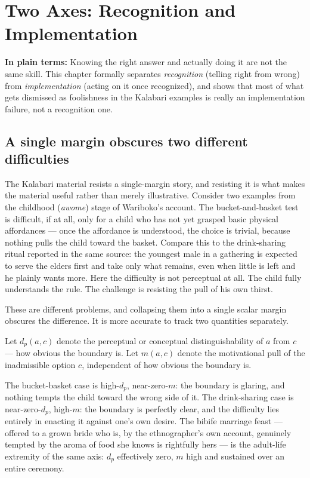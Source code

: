\chapter{Two Axes: Recognition and Implementation}
\label{ch:two-axes}

\begin{plainlanguage}
\textbf{In plain terms:} Knowing the right answer and actually doing it are not the same skill. This chapter formally separates \emph{recognition} (telling right from wrong) from \emph{implementation} (acting on it once recognized), and shows that most of what gets dismissed as foolishness in the Kalabari examples is really an implementation failure, not a recognition one.
\end{plainlanguage}

\section{A single margin obscures two different difficulties}

The Kalabari material resists a single-margin story, and resisting it is what makes the material useful rather than merely illustrative. Consider two examples from the childhood (\emph{awome}) stage of Wariboko's account. The bucket-and-basket test is difficult, if at all, only for a child who has not yet grasped basic physical affordances --- once the affordance is understood, the choice is trivial, because nothing pulls the child toward the basket. Compare this to the drink-sharing ritual reported in the same source: the youngest male in a gathering is expected to serve the elders first and take only what remains, even when little is left and he plainly wants more. Here the difficulty is not perceptual at all. The child fully understands the rule. The challenge is resisting the pull of his own thirst.

These are different problems, and collapsing them into a single scalar margin obscures the difference. It is more accurate to track two quantities separately.

\begin{definition}
Let $d_p(a,c)$ denote the perceptual or conceptual distinguishability of $a$ from $c$ --- how obvious the boundary is. Let $m(a,c)$ denote the motivational pull of the inadmissible option $c$, independent of how obvious the boundary is.
\end{definition}

The bucket-basket case is high-$d_p$, near-zero-$m$: the boundary is glaring, and nothing tempts the child toward the wrong side of it. The drink-sharing case is near-zero-$d_p$, high-$m$: the boundary is perfectly clear, and the difficulty lies entirely in enacting it against one's own desire. The bibife marriage feast --- offered to a grown bride who is, by the ethnographer's own account, genuinely tempted by the aroma of food she knows is rightfully hers --- is the adult-life extremity of the same axis: $d_p$ effectively zero, $m$ high and sustained over an entire ceremony.

